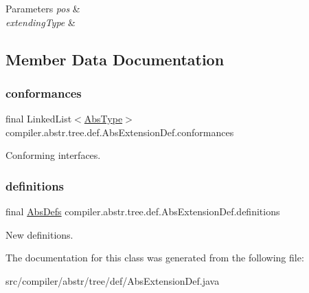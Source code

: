 \begin{DoxyParams}{Parameters}
{\em pos} & \\
\hline
{\em extending\+Type} & \\
\hline
\end{DoxyParams}


\subsection{Member Data Documentation}
\mbox{\label{classcompiler_1_1abstr_1_1tree_1_1def_1_1_abs_extension_def_a1d827271c43d2563392448f451e2828e}} 
\subsubsection{\texorpdfstring{conformances}{conformances}}
{\footnotesize\ttfamily final Linked\+List$<$\hyperlink{classcompiler_1_1abstr_1_1tree_1_1type_1_1_abs_type}{Abs\+Type}$>$ compiler.\+abstr.\+tree.\+def.\+Abs\+Extension\+Def.\+conformances}

Conforming interfaces. \mbox{\label{classcompiler_1_1abstr_1_1tree_1_1def_1_1_abs_extension_def_aedde8ef9d3532da24ca7e2121ffe255a}} 
\subsubsection{\texorpdfstring{definitions}{definitions}}
{\footnotesize\ttfamily final \hyperlink{classcompiler_1_1abstr_1_1tree_1_1_abs_defs}{Abs\+Defs} compiler.\+abstr.\+tree.\+def.\+Abs\+Extension\+Def.\+definitions}

New definitions. 

The documentation for this class was generated from the following file\+:\begin{DoxyCompactItemize}
\item 
src/compiler/abstr/tree/def/Abs\+Extension\+Def.\+java\end{DoxyCompactItemize}
